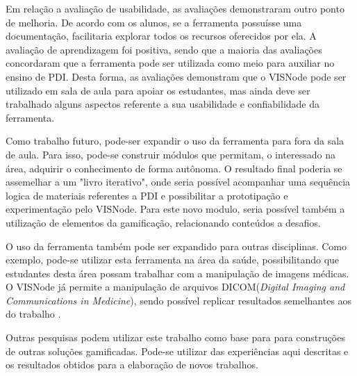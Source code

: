 \documentclass[
	12pt,				%
	oneside,			%
	a4paper,			%
	english,			%
	french,				%
	spanish,			%
	brazil,				%
	]{abntex2}
\begin{document}
Em relação a avaliação de usabilidade, as avaliações demonstraram outro ponto de melhoria. De acordo com os alunos, se a ferramenta possuísse uma documentação, facilitaria explorar todos os recursos oferecidos por ela. A avaliação de aprendizagem foi positiva, sendo que a maioria das avaliações concordaram que a ferramenta pode ser utilizada como meio para auxiliar no ensino de PDI. Desta forma, as avaliações demonstram que o VISNode pode ser utilizado em sala de aula para apoiar os estudantes, mas ainda deve ser trabalhado alguns aspectos referente a sua usabilidade e confiabilidade da ferramenta.

Como trabalho futuro, pode-ser expandir o uso da ferramenta para fora da sala de aula. Para isso, pode-se construir módulos que permitam, o interessado na área, adquirir o conhecimento de forma autônoma. O resultado final poderia se assemelhar a um "livro iterativo", onde seria possível acompanhar uma sequência logica de materiais referentes a PDI e possibilitar a prototipação e experimentação pelo VISNode. Para este novo modulo, seria possível também a utilização de elementos da gamificação, relacionando conteúdos a desafios.

O uso da ferramenta também pode ser expandido para outras disciplinas. Como exemplo, pode-se utilizar esta ferramenta na área da saúde, possibilitando que estudantes desta área possam trabalhar com a manipulação de imagens médicas. O VISNode já permite a manipulação de arquivos DICOM(\textit{Digital Imaging and Communications in Medicine}), sendo possível replicar resultados semelhantes aos do trabalho \citet{ronnau2015}.

Outras pesquisas podem utilizar este trabalho como base para para construções de outras soluções gamificadas. Pode-se utilizar das experiências aqui descritas e os resultados obtidos para a elaboração de novos trabalhos.

\postextual





\end{document}

